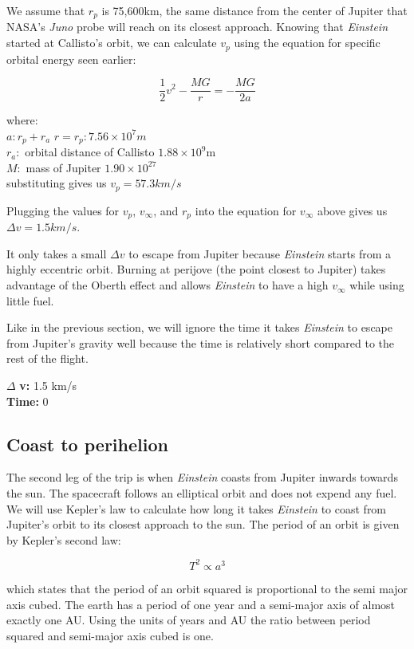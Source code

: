 \documentclass[12pt]{article} %
\begin{document}
We assume that $r_p$ is 75,600km, the same distance from the center of Jupiter that NASA's \textit{Juno} probe will reach on its closest approach. Knowing that \textit{Einstein} started at Callisto's orbit, we can calculate $v_p$ using the equation for specific orbital energy seen earlier:

$$\frac{1}{2}v^2-\frac{MG}{r} = -\frac{MG}{2a}$$

where:\\
$a: r_p + r_a$
$r = r_p: 7.56\times 10^7m$\\
$r_a:$ orbital distance of Callisto $1.88 \times 10^9$m\\
$M:$ mass of Jupiter $1.90\times10^27$\\


substituting gives us \textbf{$v_p = 57.3 km/s$}

Plugging the values for $v_p$, $v_{\infty}$, and $r_p$ into the equation for $v_{\infty}$ above gives us \textbf{$\Delta v = 1.5km/s$}.

It only takes a small $\Delta v$ to escape from Jupiter because \textit{Einstein} starts from a highly eccentric orbit. Burning at perijove (the point closest to Jupiter) takes advantage of the Oberth effect and allows \textit{Einstein} to have a high $v_{\infty}$ while using little fuel.

Like in the previous section, we will ignore the time it takes \textit{Einstein} to escape from Jupiter's gravity well because the time is relatively short compared to the rest of the flight. 


$\Delta$ \textbf{v:} 1.5 km/s\\
\textbf{Time:} 0

\subsection{Coast to perihelion}
The second leg of the trip is when \textit{Einstein} coasts from Jupiter inwards towards the sun. The spacecraft follows an elliptical orbit and does not expend any fuel. We will use Kepler's law to calculate how long it takes \textit{Einstein} to coast from Jupiter's orbit to its closest approach to the sun. The period of an orbit is given by Kepler's second law:

$$T^2 \propto a^3$$

which states that the period of an orbit squared is proportional to the semi major axis cubed. The earth has a period of one year and a semi-major axis of almost exactly one AU. Using the units of years and AU the ratio between period squared and semi-major axis cubed is one.
\end{document}
